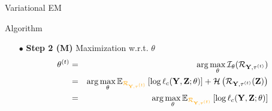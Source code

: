 \documentclass[compress,10pt]{beamer}
\begin{document}
\begin{frame}{Variational  EM}

\begin{block}{Algorithm}
\begin{enumerate}
 \item[$\bullet$]\textbf{Step 2 (M)} Maximization  w.r.t.  $\theta$
 \begin{eqnarray*}
 \theta^{(t)} &=& \arg \max_{\theta}   \mathcal{I}_{\theta}(\mathcal{R}_{\Xall,\btau^{(t)}}) \\
 &=&   \arg \max_{\theta} \mathbb{E}_{\color{dgreen}\mathcal{R}_{\Xall,\btau^{(t)}}} \left[\log \ell_c(\bX,\bZ;  \theta)   \right]  +   \mathcal{H}\left(\mathcal{R}_{\Xall,\btau^{(t)}}(\bZ)\right)\\
&=&  \arg \max_{\theta} \mathbb{E}_{\color{dgreen}\mathcal{R}_{\Xall,\btau^{(t)}}} \left[\log \ell_c(\bX,\bZ;  \theta)   \right]  
 \end{eqnarray*}
 
\end{enumerate}

 \end{block} 
 \end{frame}
\end{document}
